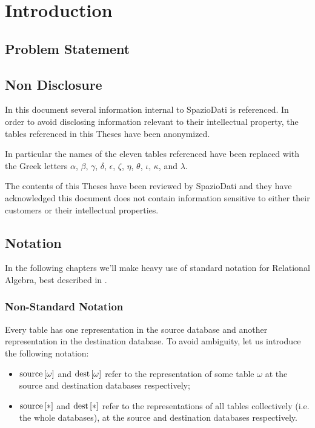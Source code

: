 \chapter{Introduction}
\label{ch:intro}


\section{Problem Statement}

\section{Non Disclosure}
\label{sec:non-disclosure}

In this document several information internal to SpazioDati is referenced.
In order to avoid disclosing information relevant to their intellectual property, the tables referenced in this Theses have been anonymized.

In particular the names of the eleven tables referenced have been replaced with the Greek letters $\alpha$, $\beta$, $\gamma$, $\delta$, $\epsilon$, $\zeta$, $\eta$, $\theta$, $\iota$, $\kappa$, and $\lambda$.


The contents of this Theses have been reviewed by SpazioDati and they have acknowledged this document does not contain information sensitive to either their customers or their intellectual properties.


\section{Notation}

In the following chapters we'll make heavy use of standard notation for Relational Algebra, best described in \cite[Chapter 4]{dbms}.

\subsection{Non-Standard Notation}

Every table has one representation in the source database and another representation in the destination database.
To avoid ambiguity, let us introduce the following notation:

\begin{itemize}
	\item $\text{source}\left[{\omega}\right]$ and $\text{dest}\left[{\omega}\right]$ refer to the representation of some table $\omega$ at the source and destination databases respectively;
	\item $\text{source}\left[{*}\right]$ and $\text{dest}\left[{*}\right]$ refer to the representations of all tables collectively (i.e. the whole databases), at the source and destination databases respectively.
\end{itemize}
